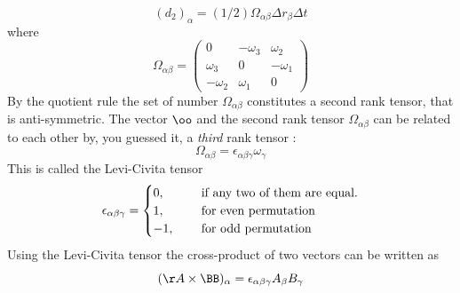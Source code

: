 \documentclass{tufte-book} %
\begin{document}
\begin{subappendices}
\begin{equation}
(d_2)_{\alpha} = (1/2)\Omega_{\alpha\beta} \Delta r_{\beta} \Delta t
\end{equation}
where  
\begin{equation}
\Omega_{\alpha\beta} = 
\begin{pmatrix}
0 & -\omega_3  & \omega_2 \\
\omega_3 & 0 & -\omega_1 \\
-\omega_2  & \omega_1 & 0 
\end{pmatrix}
\end{equation}
By the quotient rule the set of number $\Omega_{\alpha\beta}$ 
constitutes a second rank tensor, that is anti-symmetric. 
The vector $\oo$ and the second rank tensor $\Omega_{\alpha\beta}$ 
can be related to each other by, you guessed it, a \textit{third} rank
tensor :
\begin{equation}
\Omega_{\alpha\beta} = \epsilon_{\alpha\beta\gamma}\omega_{\gamma}
\end{equation}
This is called  the Levi-Civita tensor
\begin{equation}
\epsilon_{\alpha\beta\gamma} =
\begin{cases}
 0 \/,&\quad \text{ if any two of them are equal.} \\
1 \/,&\quad \text{ for even permutation} \\
-1 \/,& \quad \text{ for odd permutation}   
\end{cases} 
\end{equation}
Using the  Levi-Civita tensor the cross-product of two vectors can be
written as
\begin{equation}
(\AA\times\BB)_{\alpha} = \epsilon_{\alpha\beta\gamma}A_{\beta}B_{\gamma}
\end{equation}
\end{subappendices}
\end{document}
